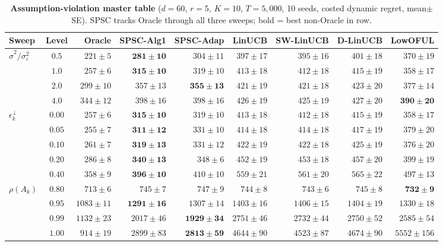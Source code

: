 \documentclass{article}
\begin{document}
\begin{table}[!htbp]
\centering
\caption{\textbf{Assumption-violation master table} ($d{=}60$,
$r{=}5$, $K{=}10$, $T{=}5{,}000$, 10 seeds, costed dynamic regret,
mean$\pm$SE). SPSC tracks Oracle through all three sweeps; bold =
best non-Oracle in row.}
\label{tab:assumption_master}
\footnotesize
\setlength{\tabcolsep}{4pt}
\begin{tabular}{lcrrrrrrr}
\toprule
Sweep & Level & Oracle & SPSC-Alg1 & SPSC-Adap & LinUCB & SW-LinUCB & D-LinUCB & LowOFUL \\
\midrule
\multirow{4}{*}{$\widehat\sigma^2/\sigma_\varepsilon^2$}
 & $0.5$ & $221\pm5$  & $\mathbf{281\pm10}$ & $304\pm11$ & $397\pm17$ & $395\pm16$ & $401\pm18$ & $370\pm19$ \\
 & $1.0$ & $257\pm6$  & $\mathbf{315\pm10}$ & $319\pm10$ & $413\pm18$ & $412\pm18$ & $415\pm19$ & $358\pm17$ \\
 & $2.0$ & $299\pm10$ & $357\pm13$ & $\mathbf{355\pm13}$ & $421\pm19$ & $421\pm18$ & $423\pm20$ & $377\pm14$ \\
 & $4.0$ & $344\pm12$ & $398\pm16$ & $398\pm16$ & $426\pm19$ & $425\pm19$ & $427\pm20$ & $\mathbf{390\pm20}$ \\
\midrule
\multirow{5}{*}{$\epsilon_k^\perp$}
 & $0.00$ & $257\pm6$ & $\mathbf{315\pm10}$ & $319\pm10$ & $413\pm18$ & $412\pm18$ & $415\pm19$ & $358\pm17$ \\
 & $0.05$ & $255\pm7$ & $\mathbf{311\pm12}$ & $331\pm10$ & $414\pm18$ & $414\pm18$ & $417\pm19$ & $379\pm20$ \\
 & $0.10$ & $261\pm7$ & $\mathbf{319\pm13}$ & $331\pm12$ & $422\pm19$ & $422\pm18$ & $425\pm19$ & $376\pm20$ \\
 & $0.20$ & $286\pm8$ & $\mathbf{340\pm13}$ & $348\pm6$  & $452\pm19$ & $453\pm18$ & $457\pm20$ & $399\pm19$ \\
 & $0.40$ & $358\pm9$ & $\mathbf{396\pm10}$ & $410\pm10$ & $559\pm21$ & $561\pm20$ & $565\pm22$ & $497\pm13$ \\
\midrule
\multirow{4}{*}{$\rho(A_k)$}
 & $0.80$ & $713\pm6$   & $745\pm7$    & $747\pm9$    & $744\pm8$   & $743\pm6$   & $745\pm8$   & $\mathbf{732\pm9}$ \\
 & $0.95$ & $1083\pm11$ & $\mathbf{1291\pm16}$ & $1307\pm14$  & $1403\pm16$ & $1406\pm15$ & $1404\pm19$ & $1330\pm18$ \\
 & $0.99$ & $1132\pm23$ & $2017\pm46$  & $\mathbf{1929\pm34}$ & $2751\pm46$ & $2732\pm44$ & $2750\pm52$ & $2585\pm54$ \\
 & $1.00$ & $914\pm19$  & $2899\pm83$  & $\mathbf{2813\pm59}$ & $4644\pm90$ & $4523\pm87$ & $4674\pm90$ & $5552\pm156$ \\
\bottomrule
\end{tabular}
\end{table}
\end{document}
